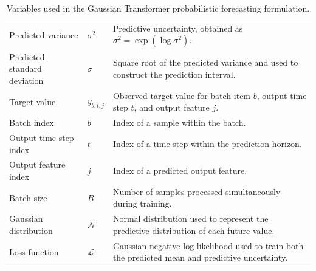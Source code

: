 \documentclass[a4paper]{article}
\begin{document}
\begin{table}[H]
\begin{tabular}{p{} p{} p{}}
         Predicted variance
         & $\sigma^2$
         & Predictive uncertainty, obtained as $\sigma^2=\exp(\log\sigma^2)$. \\

         Predicted standard deviation
         & $\sigma$
         & Square root of the predicted variance and used to construct the prediction interval. \\

         Target value
         & $y_{b,t,j}$
         & Observed target value for batch item $b$, output time step $t$, and output feature $j$. \\

         Batch index
         & $b$
         & Index of a sample within the batch. \\

         Output time-step index
         & $t$
         & Index of a time step within the prediction horizon. \\

         Output feature index
         & $j$
         & Index of a predicted output feature. \\

         Batch size
         & $B$
         & Number of samples processed simultaneously during training. \\

         Gaussian distribution
         & $\mathcal{N}$
         & Normal distribution used to represent the predictive distribution of each future value. \\

         Loss function
         & $\mathcal{L}$
         & Gaussian negative log-likelihood used to train both the predicted mean and predictive uncertainty. \\

         \hline

      \end{tabular}

      \caption{Variables used in the Gaussian Transformer probabilistic forecasting formulation.}

      \label{tab:gaussian-transformer-variables}

   \end{table}
   
   
\end{document}
